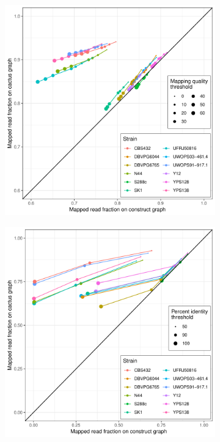 \documentclass{article}
\begin{document}
\clearpage
\begin{figure}
  \begin{subfigure}[b]{.5\textwidth}
    \caption{}
    \includegraphics[width=\textwidth]{pdf/yeast-mapping-quality.pdf}
  \end{subfigure}
  \begin{subfigure}[b]{.5\textwidth}
    \caption{}
    \includegraphics[width=\textwidth]{pdf/yeast-mapping-identity.pdf}
  \end{subfigure}
\end{figure}
\end{document}
